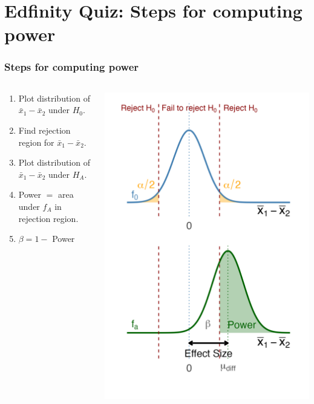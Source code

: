 \documentclass[slidestop,compress,mathserif]{beamer}
\begin{document}

\section{Edfinity Quiz: Steps for computing power}


\begin{frame}
\frametitle{Steps for computing power}
  \begin{columns}[T]
    \begin{column}{0.5\textwidth}
      \begin{enumerate}
        \item Plot distribution of $\bar{x}_1 - \bar{x}_2$ under $H_0$.
        \item Find rejection region for $\bar{x}_1 - \bar{x}_2$.
        \item Plot distribution of $\bar{x}_1 - \bar{x}_2$ under $H_A$.
        \item Power $= $ area under $f_A$ in rejection region.
        \item $\beta = 1 - $ Power
      \end{enumerate}
    \end{column}
    \begin{column}{0.5\textwidth}
      \includegraphics[width=\textwidth]{figures/power_2sample_schematic_twosided.png}

\end{column}
\end{columns}
\end{frame}
\end{document}
